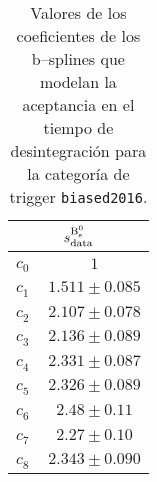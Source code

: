\begin{table}[H]
\begin{multicols}{3}
\begin{tabular}{cc}
\toprule 
\multicolumn{2}{c}{$s_{\text{data}}^{\text{B}{}_{\text{s}}^{\text{0}}}$} \\ \midrule
$ c_0^{\phantom{B}} $&$   1                  $\\
$ c_1^{\phantom{B}}  $&$   1.511 \pm 0.085    $\\
$ c_2^{\phantom{B}}  $&$   2.107 \pm 0.078    $\\
$ c_3^{\phantom{B}}  $&$   2.136 \pm 0.089    $\\
$ c_4^{\phantom{B}}  $&$   2.331 \pm 0.087    $\\
$ c_5^{\phantom{B}}  $&$   2.326 \pm 0.089    $\\
$ c_6^{\phantom{B}}  $&$   2.48  \pm 0.11     $\\
$ c_7^{\phantom{B}}  $&$   2.27  \pm 0.10     $\\
$ c_8^{\phantom{B}}  $&$   2.343 \pm 0.090    $\\
\bottomrule
\end{tabular}

\end{multicols}
\caption{Valores de los coeficientes de los b--splines que modelan la aceptancia en el tiempo de desintegración para la categoría de trigger \texttt{biased2016}.} \label{tab:acctimebsdatabiased2016}
\end{table}


